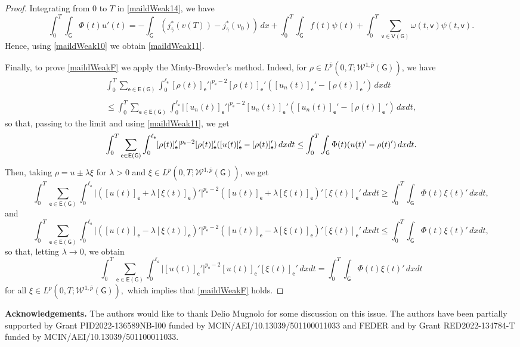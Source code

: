\documentclass[reqno,12pt]{amsart}
\def\e{\mathsf{e}} 	%
\def\v{\mathsf{v}}	%
\newcommand{\G}{\mathsf{G}}	%
\newcommand{\V}{\mathsf{V}}	%
\newcommand{\E}{\mathsf{E}}	%
\numberwithin{equation}{section} %
\begin{document}
\begin{proof}
Integrating from $0$ to $T$ in \eqref{maildWeak14}, we have 
 $$ \int_0^T\int_\G \Phi(t) u'(t) =-\int_\G  (j^*_{\overline{\gamma}}(v(T)) - j^*_{\overline{\gamma}}(v_{0}))  \, d x  +  \displaystyle  \int_0^T  \int_{\G} f (t) \psi(t) + \int_0^T \sum_{\v\in \V(\G)}  \omega(t,\v) \psi(t,\v).$$
 Hence, using \eqref{maildWeak10} we obtain \eqref{maildWeak11}.

 Finally, to prove \eqref{maildWeakF} we apply the Minty-Browder's method. Indeed, for $\rho \in  L^{\overline{p}}(0,T; \mathcal{W}^{1,\overline{p}}(\G))$, we have  
 $$
 \begin{array}{c}
 \displaystyle
 \int_0^T  \sum_{\e \in\E(\G)}\int_{0}^{\ell_\e} [\rho(t)]_\e' \vert^{p_\e -2} [\rho(t)]_\e' ([u_n(t)]_\e' - [\rho(t)]_\e') \,dxdt
 \\ \\ \displaystyle
 \leq  \int_0^T \sum_{\e \in\E(\G)}\int_{0}^{\ell_\e} \vert [u_n(t)]_\e' \vert^{p_\e -2} [u_n(t)]_\e' ([u_n(t)]_\e' - [\rho(t)]_\e')\, dxdt,
 \end{array}
 $$
 so that, passing to the limit and using \eqref{maildWeak11}, we get  
 $$ \int_0^T  \sum_{\e \in\E(\G)}\int_{0}^{\ell_\e} [\rho(t)]_\e' \vert^{p_\e -2} [\rho(t)]_\e' ([u(t)]_\e' - [\rho(t)]_\e') \,dxdt  \\ \\
 \leq \int_0^T \int_\G \Phi(t)(u(t)' - \rho(t)')\, dxdt.
 $$
 Then, taking $\rho =  u \pm \lambda \xi$ for $\lambda >0$ and $\xi \in  L^p(0,T; \mathcal{W}^{1,\overline{p}}(\G))$, we get  
 $$  
 \int_0^T  \sum_{\e \in\E(\G)}\int_{0}^{\ell_\e}\vert ([u(t)]_\e+\lambda [\xi(t)]_\e)' \vert^{p_\e -2}([u(t)]_\e+ \lambda [\xi(t)]_\e)' [\xi(t)]_\e'\, dxdt \ge  \int_0^T \int_\G \Phi(t) \xi(t)'\,dxdt, $$
 and
 $$  
 \int_0^T  \sum_{\e \in\E(\G)}\int_{0}^{\ell_\e}\vert ([u(t)]_\e-\lambda [\xi(t)]_\e)' \vert^{p_\e -2}([u(t)]_\e- \lambda [\xi(t)]_\e)' [\xi(t)]_\e'\, dxdt \le  \int_0^T \int_\G \Phi(t) \xi(t)'\,dxdt, $$
 so that, letting $\lambda \to 0$, we obtain  
  $$  \int_0^T  \sum_{\e \in\E(\G)}\int_{0}^{\ell_\e} \vert [u(t)]_\e'\vert^{p_\e -2}[u(t)]_\e' [\xi(t)]_\e'\,dxdt= \int_0^T \int_\G \Phi(t) \xi(t)' \,dxdt$$
  for all $\xi \in  L^p(0,T; \mathcal{W}^{1,\overline{p}}(\G)),$
 which implies that \eqref{maildWeakF} holds.
     \end{proof}



{\flushleft \bf Acknowledgements.} The authors would like to thank Delio Mugnolo for some discussion on this issue.   The  authors  have been partially supported  by  Grant PID2022-136589NB-I00 funded by MCIN/AEI/10.13039/501100011033 and FEDER and by Grant RED2022-134784-T funded by MCIN/AEI/10.13039/501100011033.
\end{document}
